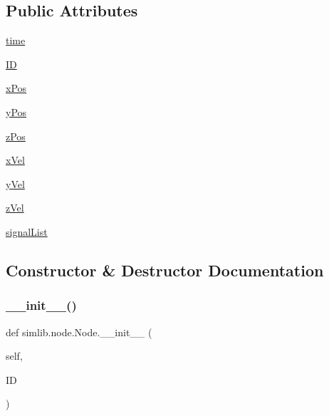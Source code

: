 \subsection*{Public Attributes}
\begin{DoxyCompactItemize}
\item 
\mbox{\hyperlink{classsimlib_1_1node_1_1_node_a00cadc2f8f0b1641db5f678edb2ef080}{time}}
\item 
\mbox{\hyperlink{classsimlib_1_1node_1_1_node_af8798fcb88771789fce24e31e36b19af}{ID}}
\item 
\mbox{\hyperlink{classsimlib_1_1node_1_1_node_aca591a37f1bc0e27946fc32539b2218b}{x\+Pos}}
\item 
\mbox{\hyperlink{classsimlib_1_1node_1_1_node_a122d8d3c173fdd0463f01ef0cac3f1cc}{y\+Pos}}
\item 
\mbox{\hyperlink{classsimlib_1_1node_1_1_node_abb4fa2ca29a17b1fa2c3ab5dfc49f946}{z\+Pos}}
\item 
\mbox{\hyperlink{classsimlib_1_1node_1_1_node_a6ec4e0dd2c3ed5fb68cf34d91439df2f}{x\+Vel}}
\item 
\mbox{\hyperlink{classsimlib_1_1node_1_1_node_afad5609f2bb90cd489097775643b15e8}{y\+Vel}}
\item 
\mbox{\hyperlink{classsimlib_1_1node_1_1_node_ad6c09d6f475cfb8bb29455e4d03777dd}{z\+Vel}}
\item 
\mbox{\hyperlink{classsimlib_1_1node_1_1_node_a428c4962cfc4d2edbd87efcbd5271596}{signal\+List}}
\end{DoxyCompactItemize}


\subsection{Constructor \& Destructor Documentation}
\mbox{\label{classsimlib_1_1node_1_1_node_ac6ef99e7e1c00c83ab001912a3d877b3}} 
\subsubsection{\texorpdfstring{\+\_\+\+\_\+init\+\_\+\+\_\+()}{\_\_init\_\_()}}
{\footnotesize\ttfamily def simlib.\+node.\+Node.\+\_\+\+\_\+init\+\_\+\+\_\+ (\begin{DoxyParamCaption}\item[{}]{self,  }\item[{}]{ID }\end{DoxyParamCaption})}



